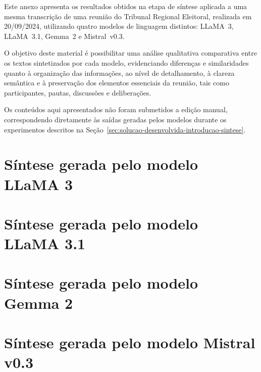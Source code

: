\label{an:sintese-results}

Este anexo apresenta os resultados obtidos na etapa de síntese aplicada a uma mesma transcrição de uma reunião do Tribunal Regional Eleitoral, realizada em 20/09/2024, utilizando quatro modelos de linguagem distintos: LLaMA~3, LLaMA~3.1, Gemma~2 e Mistral~v0.3.

O objetivo deste material é possibilitar uma análise qualitativa comparativa entre os textos sintetizados por cada modelo, evidenciando diferenças e similaridades quanto à organização das informações, ao nível de detalhamento, à clareza semântica e à preservação dos elementos essenciais da reunião, tais como participantes, pautas, discussões e deliberações.

Os conteúdos aqui apresentados não foram submetidos a edição manual, correspondendo diretamente às saídas geradas pelos modelos durante os experimentos descritos na Seção~\ref{sec:solucao-desenvolvida-introducao-sintese}.

\section*{Síntese gerada pelo modelo LLaMA 3}



\section*{Síntese gerada pelo modelo LLaMA 3.1}



\section*{Síntese gerada pelo modelo Gemma 2}



\section*{Síntese gerada pelo modelo Mistral v0.3}


